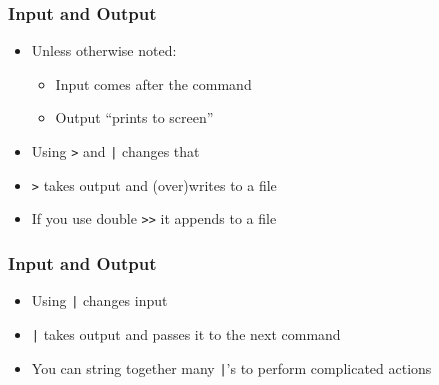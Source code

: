 \documentclass[14pt]{beamer}
\begin{document}
\begin{frame}
\frametitle{Input and Output}
\begin{itemize}
	\item Unless otherwise noted:
	\begin{itemize}
		\item Input comes after the command
		\item Output ``prints to screen''
	\end{itemize}
	\item Using \texttt{>} and \texttt{|} changes that
	\item \texttt{>} takes output and (over)writes to a file
	\ttfamily
	\sffamily
	\normalsize
	\item If you use double \texttt{>>} it appends to a file
	\ttfamily
\end{itemize}
\end{frame}

\begin{frame}
\frametitle{Input and Output}
\begin{itemize}
	\item Using \texttt{|} changes input
	\item \texttt{|} takes output and passes it to the next command
	\ttfamily
	\sffamily
	\normalsize
	\item You can string together many \texttt{|}'s to perform complicated actions
\end{itemize}
\end{frame}
\end{document}
